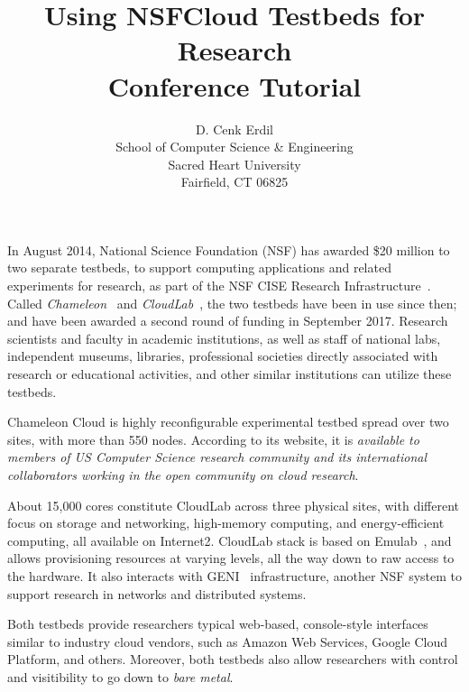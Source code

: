 \documentclass{article}
\title{Using NSFCloud Testbeds for Research\\
\vspace{0.2in}
\large{
Conference Tutorial
}}
\author{
D. Cenk Erdil\\
School of Computer Science {\&} Engineering\\
Sacred Heart University\\
Fairfield, CT 06825\\
\email{erdild@sacredheart.edu}
}
\begin{document}
\maketitle


In August 2014, National Science Foundation (NSF) has awarded \$20 million to two separate testbeds, to support computing applications and related experiments for research, as part of the NSF CISE Research Infrastructure~\cite{nsfcloud}. Called \textit{Chameleon}~\cite{chameleon} and \textit{CloudLab}~\cite{cloudlab}, the two testbeds have been in use since then; and have been awarded a second round of funding in September 2017. Research scientists and faculty in academic institutions, as well as staff of national labs, independent museums, libraries, professional societies directly associated with research or educational activities, and other similar institutions can utilize these testbeds.

Chameleon Cloud is highly reconfigurable experimental testbed spread over two sites, with more than 550 nodes. According to its website, it is \textit{available to members of US Computer Science research community and its international collaborators working in the open community on cloud research}.

About 15,000 cores constitute CloudLab across three physical sites, with different focus on storage and networking, high-memory computing, and energy-efficient computing, all available on Internet2. CloudLab stack is based on Emulab~\cite{emulab}, and allows provisioning resources at varying levels, all the way down to raw access to the hardware. It also interacts with GENI~\cite{geni} infrastructure, another NSF system to support research in networks and distributed systems.

Both testbeds provide researchers typical web-based, console-style interfaces similar to industry cloud vendors, such as Amazon Web Services, Google Cloud Platform, and others. Moreover, both testbeds also allow researchers with control and visitibility to go down to \textit{bare metal}.
\end{document}
